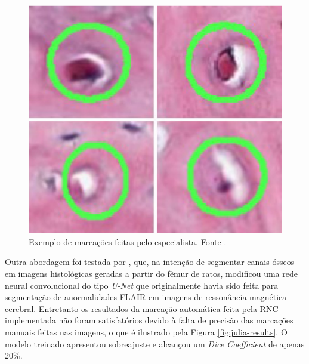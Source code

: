 \begin{figure}[H]
  \centering
  \includegraphics[width=.3\linewidth]{figures/2_theoric_foundamentations/pedro/bad_labelling.png}
  \caption[Exemplo de marcações feitas pelo especialista em \cite{gondim2021automatic}]{Exemplo de marcações feitas pelo especialista. Fonte \cite{gondim2021automatic}.}
  \label{fig:gondim-bad-labelling}
\end{figure}



Outra abordagem foi testada por \cite{julia2021histological}, que, na intenção de segmentar canais ósseos em imagens histológicas geradas a partir do fêmur de ratos, modificou uma rede neural convolucional do tipo \textit{U-Net} que originalmente havia sido feita para segmentação de anormalidades FLAIR em imagens de ressonância magnética cerebral. Entretanto os resultados da marcação automática feita pela \ac{RNC} implementada não foram satisfatórios devido à falta de precisão das marcações manuais feitas nas imagens, o que é ilustrado pela Figura \ref{fig:julia-results}. O modelo treinado apresentou sobreajuste e alcançou um \textit{Dice Coefficient} de apenas 20\%.

